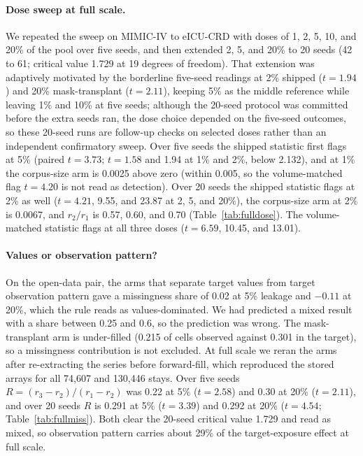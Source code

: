 \documentclass[10pt]{article}
\theoremstyle{definition}
\begin{document}
\paragraph{Dose sweep at full scale.} We repeated the sweep on MIMIC-IV to eICU-CRD with doses of 1, 2, 5, 10, and 20\% of the pool over five seeds, and then extended 2, 5, and 20\% to 20 seeds (42 to 61; critical value 1.729 at 19 degrees of freedom). That extension was adaptively motivated by the borderline five-seed readings at 2\% shipped ($t=1.94$) and 20\% mask-transplant ($t=2.11$), keeping 5\% as the middle reference while leaving 1\% and 10\% at five seeds; although the 20-seed protocol was committed before the extra seeds ran, the dose choice depended on the five-seed outcomes, so these 20-seed runs are follow-up checks on selected doses rather than an independent confirmatory sweep. Over five seeds the shipped statistic first flags at 5\% (paired $t=3.73$; $t=1.58$ and 1.94 at 1\% and 2\%, below 2.132), and at 1\% the corpus-size arm is 0.0025 above zero (within 0.005, so the volume-matched flag $t=4.20$ is not read as detection). Over 20 seeds the shipped statistic flags at 2\% as well ($t=4.21$, 9.55, and 23.87 at 2, 5, and 20\%), the corpus-size arm at 2\% is 0.0067, and $r_2/r_1$ is 0.57, 0.60, and 0.70 (Table~\ref{tab:fulldose}). The volume-matched statistic flags at all three doses ($t=6.59$, 10.45, and 13.01).

\paragraph{Values or observation pattern?} On the open-data pair, the arms that separate target values from target observation pattern gave a missingness share of 0.02 at 5\% leakage and $-0.11$ at 20\%, which the rule reads as values-dominated. We had predicted a mixed result with a share between 0.25 and 0.6, so the prediction was wrong. The mask-transplant arm is under-filled (0.215 of cells observed against 0.301 in the target), so a missingness contribution is not excluded. At full scale we reran the arms after re-extracting the series before forward-fill, which reproduced the stored arrays for all 74,607 and 130,446 stays. Over five seeds $R=(r_3-r_2)/(r_1-r_2)$ was 0.22 at 5\% ($t=2.58$) and 0.30 at 20\% ($t=2.11$), and over 20 seeds $R$ is 0.291 at 5\% ($t=3.39$) and 0.292 at 20\% ($t=4.54$; Table~\ref{tab:fullmiss}). Both clear the 20-seed critical value 1.729 and read as mixed, so observation pattern carries about 29\% of the target-exposure effect at full scale.
\end{document}
